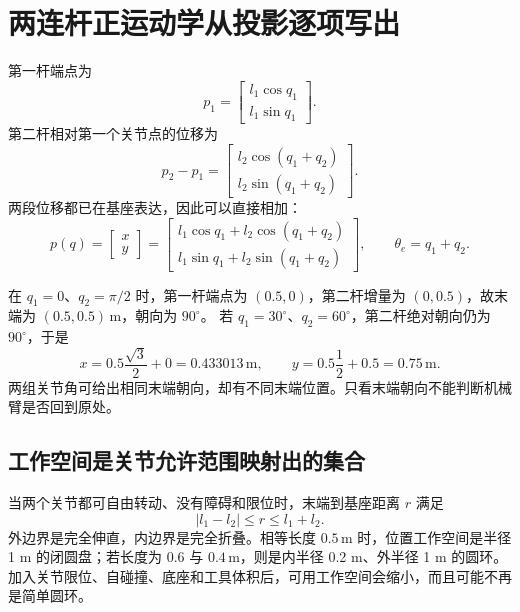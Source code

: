 \section{两连杆正运动学从投影逐项写出}
第一杆端点为
\begin{equation}
 p_1=\begin{bmatrix}l_1\cos q_1\\l_1\sin q_1\end{bmatrix}.
\end{equation}
第二杆相对第一个关节点的位移为
\begin{equation}
 p_2-p_1=\begin{bmatrix}l_2\cos(q_1+q_2)\\l_2\sin(q_1+q_2)\end{bmatrix}.
\end{equation}
两段位移都已在基座表达，因此可以直接相加：
\begin{equation}\label{eq:two_r_fk}
 p(q)=\begin{bmatrix}x\\y\end{bmatrix}
 =\begin{bmatrix}
 l_1\cos q_1+l_2\cos(q_1+q_2)\\
 l_1\sin q_1+l_2\sin(q_1+q_2)
 \end{bmatrix},\qquad\theta_e=q_1+q_2.
\end{equation}
\begin{examplebox}[算例 完整算一次关节角到末端]
在 $q_1=0$、$q_2=\pi/2$ 时，第一杆端点为 $(0.5,0)$，第二杆增量为 $(0,0.5)$，故末端为 $(0.5,0.5)\,\mathrm m$，朝向为 $90^\circ$。
若 $q_1=30^\circ$、$q_2=60^\circ$，第二杆绝对朝向仍为 $90^\circ$，于是
\[
 x=0.5\frac{\sqrt3}{2}+0=0.433013\,\mathrm m,
 \qquad y=0.5\frac12+0.5=0.75\,\mathrm m.
\]
两组关节角可给出相同末端朝向，却有不同末端位置。只看末端朝向不能判断机械臂是否回到原处。
\end{examplebox}

\subsection{工作空间是关节允许范围映射出的集合}
当两个关节都可自由转动、没有障碍和限位时，末端到基座距离 $r$ 满足
\begin{equation}
 |l_1-l_2|\le r\le l_1+l_2.
\end{equation}
外边界是完全伸直，内边界是完全折叠。相等长度 $0.5\,\mathrm m$ 时，位置工作空间是半径 1 m 的闭圆盘；若长度为 $0.6$ 与 $0.4\,\mathrm m$，则是内半径 0.2 m、外半径 1 m 的圆环。加入关节限位、自碰撞、底座和工具体积后，可用工作空间会缩小，而且可能不再是简单圆环。

